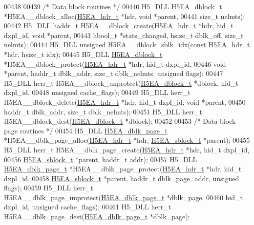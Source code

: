 \begin{DoxyCode}
00438 
00439 \textcolor{comment}{/* Data block routines */}
00440 H5\_DLL \hyperlink{struct_h5_e_a__dblock__t}{H5EA\_dblock\_t} *H5EA\_\_dblock\_alloc(\hyperlink{struct_h5_e_a__hdr__t}{H5EA\_hdr\_t} *hdr, \textcolor{keywordtype}{void} *parent,
00441     \textcolor{keywordtype}{size\_t} nelmts);
00442 H5\_DLL haddr\_t H5EA\_\_dblock\_create(\hyperlink{struct_h5_e_a__hdr__t}{H5EA\_hdr\_t} *hdr, hid\_t dxpl\_id, \textcolor{keywordtype}{void} *parent,
00443     hbool\_t *stats\_changed, hsize\_t dblk\_off, \textcolor{keywordtype}{size\_t} nelmts);
00444 H5\_DLL \textcolor{keywordtype}{unsigned} H5EA\_\_dblock\_sblk\_idx(\textcolor{keyword}{const} \hyperlink{struct_h5_e_a__hdr__t}{H5EA\_hdr\_t} *hdr, hsize\_t idx);
00445 H5\_DLL \hyperlink{struct_h5_e_a__dblock__t}{H5EA\_dblock\_t} *H5EA\_\_dblock\_protect(\hyperlink{struct_h5_e_a__hdr__t}{H5EA\_hdr\_t} *hdr, hid\_t dxpl\_id,
00446     \textcolor{keywordtype}{void} *parent, haddr\_t dblk\_addr, \textcolor{keywordtype}{size\_t} dblk\_nelmts, \textcolor{keywordtype}{unsigned} flags);
00447 H5\_DLL herr\_t H5EA\_\_dblock\_unprotect(\hyperlink{struct_h5_e_a__dblock__t}{H5EA\_dblock\_t} *dblock, hid\_t dxpl\_id,
00448     \textcolor{keywordtype}{unsigned} cache\_flags);
00449 H5\_DLL herr\_t H5EA\_\_dblock\_delete(\hyperlink{struct_h5_e_a__hdr__t}{H5EA\_hdr\_t} *hdr, hid\_t dxpl\_id, \textcolor{keywordtype}{void} *parent,
00450     haddr\_t dblk\_addr, \textcolor{keywordtype}{size\_t} dblk\_nelmts);
00451 H5\_DLL herr\_t H5EA\_\_dblock\_dest(\hyperlink{struct_h5_e_a__dblock__t}{H5EA\_dblock\_t} *dblock);
00452 
00453 \textcolor{comment}{/* Data block page routines */}
00454 H5\_DLL \hyperlink{struct_h5_e_a__dbk__page__t}{H5EA\_dblk\_page\_t} *H5EA\_\_dblk\_page\_alloc(\hyperlink{struct_h5_e_a__hdr__t}{H5EA\_hdr\_t} *hdr, 
      \hyperlink{struct_h5_e_a__sblock__t}{H5EA\_sblock\_t} *parent);
00455 H5\_DLL herr\_t H5EA\_\_dblk\_page\_create(\hyperlink{struct_h5_e_a__hdr__t}{H5EA\_hdr\_t} *hdr, hid\_t dxpl\_id,
00456     \hyperlink{struct_h5_e_a__sblock__t}{H5EA\_sblock\_t} *parent, haddr\_t addr);
00457 H5\_DLL \hyperlink{struct_h5_e_a__dbk__page__t}{H5EA\_dblk\_page\_t} *H5EA\_\_dblk\_page\_protect(\hyperlink{struct_h5_e_a__hdr__t}{H5EA\_hdr\_t} *hdr, hid\_t dxpl\_id,
00458     \hyperlink{struct_h5_e_a__sblock__t}{H5EA\_sblock\_t} *parent, haddr\_t dblk\_page\_addr, \textcolor{keywordtype}{unsigned} flags);
00459 H5\_DLL herr\_t H5EA\_\_dblk\_page\_unprotect(\hyperlink{struct_h5_e_a__dbk__page__t}{H5EA\_dblk\_page\_t} *dblk\_page,
00460     hid\_t dxpl\_id, \textcolor{keywordtype}{unsigned} cache\_flags);
00461 H5\_DLL herr\_t H5EA\_\_dblk\_page\_dest(\hyperlink{struct_h5_e_a__dbk__page__t}{H5EA\_dblk\_page\_t} *dblk\_page);

\end{DoxyCode}
